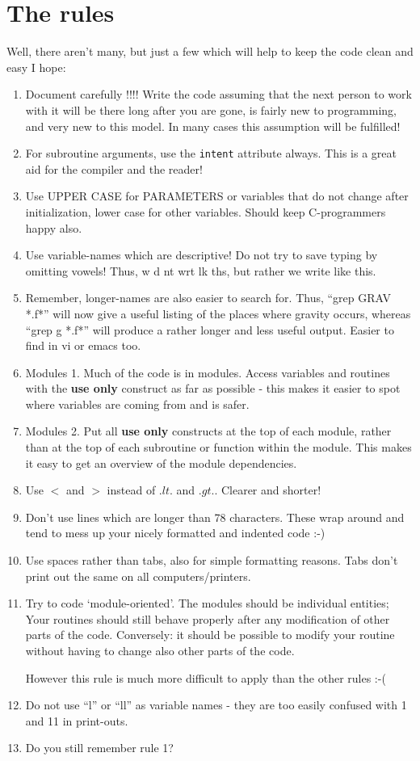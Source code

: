 \section{The rules}

Well, there aren't many, but just a few which will help to keep
the code clean and easy I hope:

\begin{enumerate}
\item
    Document carefully !!!!
    Write the code assuming that the next person to work with it will
    be there long after you are gone, is fairly new to programming,
    and very new to this model. In many cases this assumption will
    be fulfilled!
\item
    For subroutine arguments, use the {\tt intent} attribute always.
    This is a great aid for the compiler and the reader!
\item
    Use UPPER CASE for PARAMETERS or variables that do not change after
    initialization, lower case for other variables.
    Should keep C-programmers happy also.
\item
    Use variable-names which are descriptive! Do not try to save
    typing by omitting vowels! Thus, w d nt wrt lk ths, but rather
    we write like this.
\item
    Remember, longer-names are also easier to search for. Thus,
    ``grep GRAV *.f*'' will now give a useful listing of the places where
    gravity occurs, whereas ``grep g *.f*'' will produce a rather longer
    and less useful output. Easier to find in vi or emacs too.
\item Modules 1.
    Much of the code is in modules. Access variables and routines with
    the {\bf use only} construct as far as possible - this makes it
    easier to spot where variables are coming from and is safer.
\item Modules 2.
    Put all {\bf use only} constructs at the top of each module, rather than
    at the top of each subroutine or function within the module. This makes
    it easy to get an overview of the module dependencies.
\item
     Use $<$ and $>$ instead of $.lt.$ and $.gt.$. Clearer and shorter!
\item
    Don't use lines which are longer than 78 characters. These wrap
    around and tend to mess up your nicely formatted and indented code :-)
\item
    Use spaces rather than tabs, also for simple formatting reasons.
    Tabs don't print out the same on all computers/printers.
\item
    Try to code `module-oriented'. The modules should be individual
entities; Your routines should still behave properly after any
modification of other parts of the code.  Conversely: it should be
possible to modify your routine without having to change also other
parts of the code.

However this rule is much more difficult to apply than the other rules :-(


\item
    Do not use ``l'' or ``ll'' as variable names - they are too easily
    confused with 1 and 11 in print-outs.
\item
    Do you still remember rule 1?
\end{enumerate}




